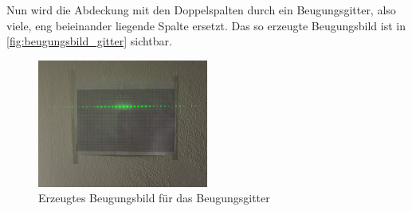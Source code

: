 \documentclass[12pt,english,ngerman]{scrartcl}
\begin{document}
\begin{figure}[H]
	 \hfill
\end{figure}

Nun wird die Abdeckung mit den Doppelspalten durch ein Beugungsgitter, also viele, eng beieinander liegende Spalte ersetzt. 
Das so erzeugte Beugungsbild ist in \autoref{fig:beugungsbild_gitter} sichtbar.

\begin{figure}[H]
	\begin{center}
		\includegraphics[width =0.5\textwidth]{./figures/beugungsbild_gitter.jpg}
	\end{center}
	\caption[ Erzeugtes Beugungsbild für das Beugungsgitter] {
        Erzeugtes Beugungsbild für das Beugungsgitter
	}\label{fig:beugungsbild_gitter}
\end{figure}
\end{document}
